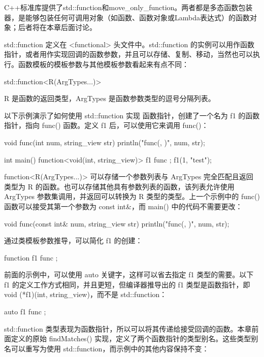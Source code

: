 
C++标准库提供了std::function和move\_only\_function。两者都是多态函数包装器，是能够包装任何可调用对象（如函数、函数对象或Lambda表达式）的函数对象；后者将在本章后面讨论。


std::function 定义在 <functional> 头文件中。std::function 的实例可以用作函数指针，或者用作实现回调的函数参数，并且可以存储、复制、移动，当然也可以执行。函数模板的模板参数与其他模板参数看起来有点不同：

\begin{cpp}
std::function<R(ArgTypes...)>
\end{cpp}

R 是函数的返回类型，ArgTypes 是函数参数类型的逗号分隔列表。

以下示例演示了如何使用 std::function 实现 函数指针，创建了一个名为 f1 的函数指针，指向 func() 函数。定义 f1 后，可以使用它来调用 func()：

\begin{cpp}
void func(int num, string_view str) { println("func({}, {})", num, str); }

int main()
{
    function<void(int, string_view)> f1 { func };
    f1(1, "test");
}
\end{cpp}

function<R(ArgTypes...)> 可以存储一个参数列表与 ArgTypes 完全匹配且返回类型为 R 的函数。也可以存储其他具有参数列表的函数，该列表允许使用 ArgTypes 参数集调用，并返回可以转换为 R 类型的类型。上一个示例中的 func() 函数可以接受其第一个参数为 const int\&，而 main() 中的代码不需要更改：

\begin{cpp}
void func(const int& num, string_view str) { println("func({}, {})", num, str); }
\end{cpp}

通过类模板参数推导，可以简化 f1 的创建：

\begin{cpp}
function f1 { func };
\end{cpp}

前面的示例中，可以使用 auto 关键字，这样可以省去指定 f1 类型的需要。以下 f1 的定义工作方式相同，并且更短，但编译器推导出的 f1 类型是函数指针，即 void (*f1)(int, string\_view)，而不是 std::function：

\begin{cpp}
auto f1 { func };
\end{cpp}

std::function 类型表现为函数指针，所以可以将其传递给接受回调的函数。本章前面定义的原始 findMatches() 实现，定义了两个函数指针的类型别名。这些类型别名可以重写为使用 std::function，而示例中的其他内容保持不变：

